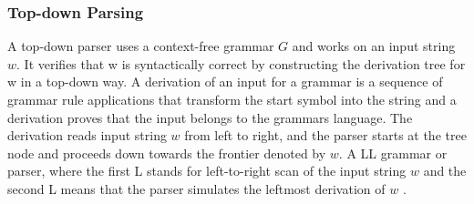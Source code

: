 \subsubsection{Top-down Parsing}

A top-down parser uses a context-free grammar $G$ and works on an input string $w$. It verifies that w is syntactically correct by constructing the derivation tree for w in a top-down way. A derivation of an input for a grammar is a sequence of grammar rule applications that transform the start symbol into the string and a derivation proves that the input belongs to the grammars language. The derivation reads input string $w$ from left to right, and the parser starts at the tree node and proceeds down towards the frontier denoted by $w$. A LL grammar or parser, where the first L stands for left-to-right scan of the input string $w$ and the second L means that the parser simulates the leftmost derivation of $w$ \cite{meduna2014formal}. 